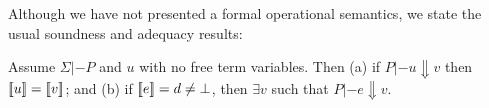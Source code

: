 \begin{comment}
Types do not matter at all for our denotational semantics.
\begin{lemma}[Type irrelevance]
It is the case that $\interp{u}{\sigma}{\rho} = \interp{u[\ol{\tau}/\as]}{\sigma}{\rho}$ 
for any type substitution of variable $\as$ to types $\taus$.
\end{lemma}
The following is an essential lemma for establishing the soundness of denotational semantics:
\begin{lemma}[Substitutivity]
If $\Sigma;\Delta,x{:}\tau |- e : \tau$ and $\rho$ is a semantic environment 
and $\Sigma;\Delta |- e' : \tau'$ then 
\[ \interp{e}{\sigma}{\rho,x |-> \interp{e'}{\sigma}{\rho}} = \interp{e[e'/x]}{\sigma}{\rho} \]
and if $\Sigma;\Delta,x{:}\tau |- u : \tau$ then 
\[ \interp{u}{\sigma}{\rho,x |-> \interp{e'}{\sigma}{\rho}} = \interp{u[e'/x]}{\sigma}{\rho} \]
\end{lemma}
\end{comment}
Although we have not presented a formal operational semantics, we state the usual
soundness and adequacy results:
\begin{theorem}\label{thm:adequacy}
Assume $\Sigma |- P$ and $u$ with no free term variables. Then (a) if $P |- u \Downarrow v$ then $[\![u]\!] = [\![v]\!] $; and (b) if $[\![e]\!] = d \not= \bot$, then 
$\exists v$ such that $P |- e \Downarrow v$.
\end{theorem}
\begin{comment}
The proof of this theorem is also standard domain theory so we only sketch the 
high-level road-map: The proof proceeds by defining a {\em logical relation} between 
semantics and syntax, via the use of a bi-functor on admissible relations between elements 
of $D_\infty$ and closed expressions, and using minimal 
invariance~\cite{pitts-rel-domains} to show that this
bi-functor has a fixpoint. Adequacy then follows from the {\em fundamental theorem} of this 
logical relation, which asserts that every expression is related to its denotation.
\end{comment}

